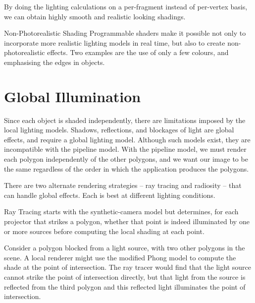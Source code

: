 \documentclass[../COS3712_Notes.tex]{subfiles}
\begin{document}
      By doing the lighting calculations on a per-fragment instead of per-vertex basis,
      we can obtain highly smooth and realistic looking shadings.

      \begin{sidenote}[float]{Non-Photorealistic Shading}
        Programmable shaders make it possible not only to incorporate more realistic lighting
        models in real time, but also to create non-photorealistic effects.
        Two examples are the use of only a few colours, and emphasising the edges in objects.
      \end{sidenote}

    \pagebreak

    \section{Global Illumination}
      Since each object is shaded independently, there are limitations imposed
      by the local lighting models.
      Shadows, reflections, and blockages of light are global effects, and require a global
      lighting model.
      Although such models exist, they are incompatible with the pipeline model.
      With the pipeline model, we must render each polygon independently of the other polygons,
      and we want our image to be the same regardless of the order in which the application
      produces the polygons.

      There are two alternate rendering strategies -- ray tracing and radiosity --
      that can handle global effects.
      Each is best at different lighting conditions.

      \begin{definition}{Ray Tracing}
         starts with the synthetic-camera model but determines,
        for each projector that strikes a polygon,
        whether that point is indeed illuminated by one or more sources
        before computing the local shading at each point.

        Consider a polygon blocked from a light source, with two other polygons in the scene.
        A local renderer might use the modified Phong model to compute the shade
        at the point of intersection.
        The ray tracer would find that the light source cannot strike the point of intersection
        directly, but that light from the source is reflected from the third polygon
        and this reflected light illuminates the point of intersection.
      \end{definition}
\end{document}
